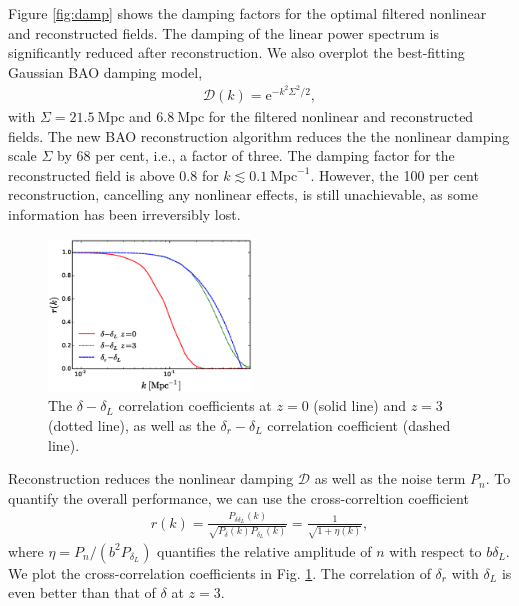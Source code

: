 \documentclass[aps,prd,twocolumn,showpacs,superscriptaddress,groupedaddress,nofootinbib]{revtex4}  %
\newcommand{\mr}{\mathrm}
\newcommand{\bea}{\begin{eqnarray}}
\newcommand{\eea}{\end{eqnarray}}
\begin{document}
Figure \ref{fig:damp} shows the damping factors for the optimal filtered 
nonlinear and reconstructed fields. The damping of the linear power spectrum is 
significantly reduced after reconstruction. We also overplot the best-fitting 
Gaussian BAO damping model,
\bea
\mathcal{D}(k)=\mr{e}^{-k^2\Sigma^2/2},
\eea
with $\Sigma=21.5\ \mr{Mpc}$ and $6.8\ \mr{Mpc}$ for the filtered nonlinear and 
reconstructed fields. 
The new BAO reconstruction algorithm reduces the the nonlinear damping
scale $\Sigma$ by 68 per cent, i.e., a factor of three. 
The damping factor for the reconstructed field is above 0.8 for 
$k\lesssim0.1\ \mr{Mpc}^{-1}$. 
However, the 100 per cent reconstruction, cancelling any nonlinear effects,
is still unachievable, as some information has been irreversibly lost. 

\begin{figure}[tbp]
\begin{center}
\includegraphics[width=0.48\textwidth]{f7x.eps}
\end{center}
\vspace{-0.7cm}
\caption{The $\delta-\delta_L$ correlation coefficients at $z=0$ (solid
line) and $z=3$ (dotted line), as well as the $\delta_r-\delta_L$ 
correlation coefficient (dashed line).}
\label{fig:xcc}
\end{figure}

Reconstruction reduces the nonlinear damping $\mathcal{D}$ as well as the noise
term $P_{n}$. To quantify the overall performance, we can use the cross-correltion coefficient 
\bea
r(k)=\frac{P_{\delta\delta_L}(k)}
{\sqrt{P_{\delta}(k)P_{\delta_L}(k)}}
=\frac{1}{\sqrt{1+\eta(k)}},
\eea
where $\eta=P_n/(b^2P_{\delta_L})$ quantifies the relative amplitude
of $n$ with respect to $b\delta_L$. We plot the cross-correlation coefficients
in Fig. \ref{fig:xcc}. The correlation of $\delta_r$ with
$\delta_L$ is even better than that of $\delta$ at $z=3$.
\end{document}
